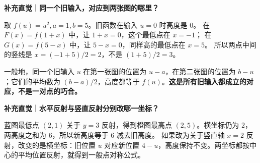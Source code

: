 \clearpage
\begin{explanationbox}
\textbf{补充直觉｜同一个旧输入，对应到两张图的哪里？}


取 $f(u)=u^2,a=1,b=5$。旧函数在输入 $u=0$ 时高度是 $0$。
在 $F(x)=f(1+x)$ 中，让 $1+x=0$，这个最低点在 $x=-1$；
在 $G(x)=f(5-x)$ 中，让 $5-x=0$，同样高的最低点在 $x=5$。
所以两点中间的竖线是 $x=(-1+5)/2=2$，不是 $(1+5)/2=3$。

一般地，同一个旧输入 $u$ 在第一张图的位置为 $u-a$，在第二张图的位置为 $b-u$；它们的平均数为 $(b-a)/2$，高度都等于 $f(u)$。\textbf{这是所有旧输入都成立的对应，不是一对点的巧合。}

\end{explanationbox}
\clearpage
\begin{explanationbox}
\textbf{补充直觉｜水平反射与竖直反射分别改哪一坐标？}


蓝图最低点 $(2,1)$ 关于 $y=3$ 反射，得到橙图最高点 $(2,5)$。横坐标仍为 $2$，两高度之和为 $6$，所以新高度等于 $6$ 减去旧高度。
如果改为关于竖直轴 $x=2$ 反射，改变的是横坐标：旧位置 $u$ 对应新位置 $4-u$，高度保持不变。两坐标都按中心的平均位置反射，就得到一般点对称公式。

\end{explanationbox}


